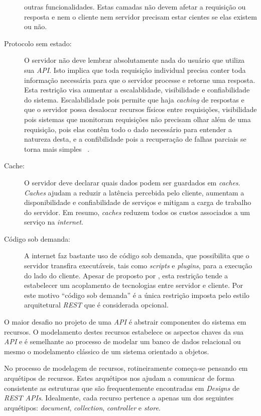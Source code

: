 \begin{description}
  outras funcionalidades. Estas camadas não devem afetar a requisição ou resposta e nem o cliente 
  nem servidor precisam estar cientes se elas existem ou não.
\item[Protocolo sem estado:] O servidor não deve lembrar absolutamente nada do usuário que 
  utiliza sua \emph{API}. Isto implica que toda requisição individual precisa conter toda 
  informação necessária para que o servidor processe e retorne uma resposta. Esta restrição 
  visa aumentar a escalablidade, visibilidade e confiabilidade do sistema. Escalabilidade pois 
  permite que haja \emph{caching} de respostas e que o servidor possa desalocar recursos 
  físicos entre requisições, visibilidade pois sistemas que monitoram requisições não 
  precisam olhar além de uma requisição, pois elas contêm todo o dado necessário 
  para entender a natureza desta, e a confibilidade pois a recuperação de falhas 
  parciais se torna mais simples \ \cite{kendall1994note}.
\item[Cache:] O servidor deve declarar quais dados podem ser guardados em \emph{caches}. 
  \emph{Caches} ajudam a reduzir a latência percebida pelo cliente, aumentam a disponibilidade 
  e confiabilidade de serviços e mitigam a carga de trabalho do servidor. Em resumo, 
  \emph{caches} reduzem todos os custos associados a um serviço na \emph{internet}.
\item[Código sob demanda:] A internet faz bastante uso de código sob demanda, que possibilita 
  que o servidor transfira executáveis, tais como \emph{scripts} e \emph{plugins}, para a 
  execução do lado do cliente. Apesar de proposto por , 
  esta restrição tende a estabelecer um acoplamento de tecnologias entre servidor e cliente. 
  Por este motivo ``código sob demanda'' é a única restrição imposta pelo estilo arquitetural 
  \emph{REST} que é considerada opcional.
\end{description}

O maior desafio no projeto de uma \emph{API} é abstrair componentes do sistema
em recursos. O modelamento destes recursos estabelece os aspectos chaves da sua \emph{API}
e é semelhante ao processo de modelar um banco de dados relacional ou mesmo o modelamento 
clássico de um sistema orientado a objetos.

No processo de modelagem de recursos, rotineiramente começa-se pensando em arquétipos de 
recursos. Estes arquétipos nos ajudam a comunicar de forma consistente 
as estruturas que são frequentemente encontradas em \emph{Designs} de \emph{REST APIs}.
Idealmente, cada recurso pertence a apenas um dos seguintes arquétipos: \emph{document}, 
\emph{collection}, \emph{controller} e \emph{store}.

